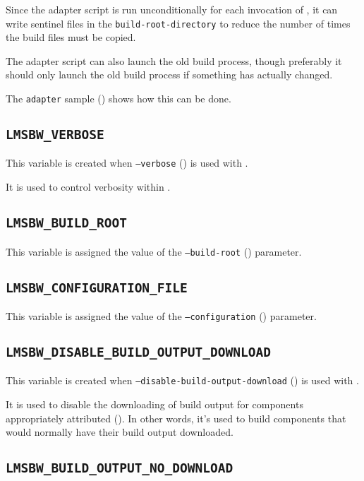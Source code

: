 Since the adapter script is run unconditionally for each invocation of
\lmsbw, it can write sentinel files in the
\texttt{build-root-directory} to reduce the number of times the build
files must be copied.

The adapter script can also launch the old build process, though
preferably it should only launch the old build process if something
has actually changed.

The \texttt{adapter} sample () shows how
this can be done.

\subsection{\texttt{LMSBW\_VERBOSE}}

This variable is created when \texttt{--verbose}
() is used with \lmsbwcmd.

It is used to control verbosity within \lmsbw.

\subsection{\texttt{LMSBW\_BUILD\_ROOT}}

This variable is assigned the value of the \texttt{--build-root}
() parameter.

\subsection{\texttt{LMSBW\_CONFIGURATION\_FILE}}

This variable is assigned the value of the \texttt{--configuration}
() parameter.

\subsection{\texttt{LMSBW\_DISABLE\_BUILD\_OUTPUT\_DOWNLOAD}}

This variable is created when \texttt{--disable-build-output-download}
() is used with
\lmsbwcmd.

It is used to disable the downloading of build output for components
appropriately attributed ().  In
other words, it's used to build components that would normally have
their build output downloaded.

\subsection{\texttt{LMSBW\_BUILD\_OUTPUT\_NO\_DOWNLOAD}}

